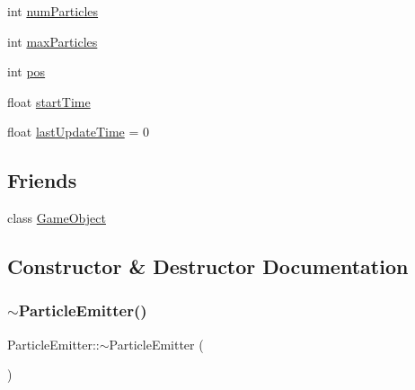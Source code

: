 \begin{DoxyCompactItemize}
\item 
int \hyperlink{class_mason_1_1_particle_emitter_a2df785f58db33ede9255ba835e955e11}{num\+Particles}
\item 
int \hyperlink{class_mason_1_1_particle_emitter_a591a7ed2fc6cded5dc19b144ece7b3fb}{max\+Particles}
\item 
int \hyperlink{class_mason_1_1_particle_emitter_a2204ca394c10b6b3a5c5bd11c34d2251}{pos}
\item 
float \hyperlink{class_mason_1_1_particle_emitter_a46d4d3d2871daba6f320dfbc1f89ace1}{start\+Time}
\item 
float \hyperlink{class_mason_1_1_particle_emitter_a79acae3c8f64f592e8868cb166b1a1ce}{last\+Update\+Time} = 0
\end{DoxyCompactItemize}
\subsection*{Friends}
\begin{DoxyCompactItemize}
\item 
class \hyperlink{class_mason_1_1_particle_emitter_a00df87c957d8f7ee0fc51f07a0542f4a}{Game\+Object}
\end{DoxyCompactItemize}


\subsection{Constructor \& Destructor Documentation}
\hypertarget{class_mason_1_1_particle_emitter_a6f4952f7555ede99d74d42b30c80f3e2}{}\label{class_mason_1_1_particle_emitter_a6f4952f7555ede99d74d42b30c80f3e2} 
\subsubsection{\texorpdfstring{$\sim$\+Particle\+Emitter()}{~ParticleEmitter()}}
{\footnotesize\ttfamily Particle\+Emitter\+::$\sim$\+Particle\+Emitter (\begin{DoxyParamCaption}{ }\end{DoxyParamCaption})}

\hypertarget{class_mason_1_1_particle_emitter_a30525758eaab5f41e625b8354e80d219}{}\label{class_mason_1_1_particle_emitter_a30525758eaab5f41e625b8354e80d219} 
